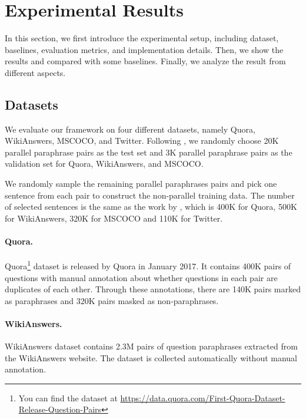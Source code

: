\section{Experimental Results}

In this section, we first introduce the experimental setup, including dataset, baselines, evaluation metrics, and implementation details. Then, we show the results and compared with some baselines.
Finally, we analyze the result from different aspects.

\subsection{Datasets}
We evaluate our framework on four different datasets, namely Quora, WikiAnswers, MSCOCO, and Twitter. Following \citet{liu2019unsupervised}, we randomly choose 20K parallel paraphrase pairs as the test set and 3K parallel paraphrase pairs as the validation set for Quora, WikiAnswers, and MSCOCO. 

We randomly sample the remaining parallel paraphrases pairs and pick one sentence from each pair to construct the non-parallel training data.
The number of selected sentences is the same as the work by \citet{liu2019unsupervised}, which is 400K for Quora, 500K for WikiAnswers, 320K for MSCOCO and 110K for Twitter.

\paragraph{Quora. } Quora\footnote{You can find the dataset at \url{https://data.quora.com/First-Quora-Dataset-Release-Question-Pairs}} dataset is released by Quora in
January 2017. It contains 400K pairs of questions with manual annotation about whether questions in each pair are duplicates of each other. Through these annotations, there are 140K pairs marked as paraphrases and 320K pairs masked as non-paraphrases. 

\paragraph{WikiAnswers. } WikiAnswers \citep{fader2013paraphrase} dataset contains 2.3M pairs of question paraphrases extracted from the WikiAnswers website. The dataset is collected automatically without manual annotation.

